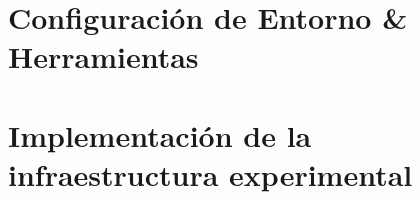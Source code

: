 
\section{Configuración de Entorno \& Herramientas}\label{exp0-environment}

 

\section{Implementación de la infraestructura experimental}


